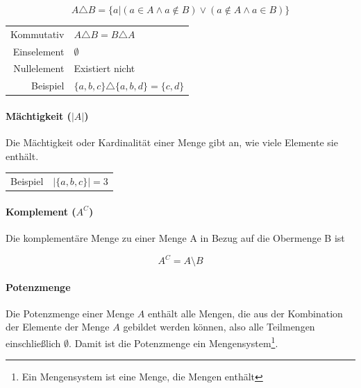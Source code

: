\documentclass[../main.tex]{subfiles}
\begin{document}
                    \begin{equation}
                        A \triangle B = \{a | \left(a \in A \wedge a \notin B\right) \vee \left(a \notin A \wedge a \in B\right)\}
                    \end{equation}
                    
                    \begin{tabular}{ r l }
						Kommutativ & $A \triangle B = B \triangle A$ \\
						Einselement & $\emptyset$ \\
						Nullelement & Existiert nicht \\
                    	Beispiel & $\{a, b, c\} \triangle \{a, b, d\} = \{c, d\}$
					\end{tabular}
                    
                \paragraph{Mächtigkeit ($|A|$)}
                    Die Mächtigkeit oder Kardinalität einer Menge gibt an, wie viele Elemente sie enthält.
                    
                    \begin{tabular}{ r l }
                    	Beispiel & $|\{a, b, c\}| = 3$
					\end{tabular}
                    
                \paragraph{Komplement ($A^C$)}
                    Die komplementäre Menge zu einer Menge A in Bezug auf die Obermenge B ist
                    
                    \begin{equation}
                        A^C = A \setminus B
                    \end{equation}
                    
                \paragraph{Potenzmenge}
                    Die Potenzmenge einer Menge $A$ enthält alle Mengen, die aus der Kombination der Elemente der Menge $A$ gebildet werden können, also alle Teilmengen einschließlich $\emptyset$. Damit ist die Potenzmenge ein Mengensystem\footnote{Ein Mengensystem ist eine Menge, die Mengen enthält}.
                    
\end{document}
